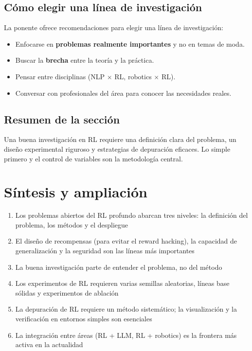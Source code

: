 \documentclass[a4paper]{article}
\begin{document}
\subsection{Cómo elegir una línea de investigación}

La ponente ofrece recomendaciones para elegir una línea de investigación:
\begin{itemize}
    \item Enfocarse en \textbf{problemas realmente importantes} y no en temas de moda.
    \item Buscar la \textbf{brecha} entre la teoría y la práctica.
    \item Pensar entre disciplinas (NLP $\times$ RL, robotics $\times$ RL).
    \item Conversar con profesionales del área para conocer las necesidades reales.
\end{itemize}

\subsection{Resumen de la sección}

Una buena investigación en RL requiere una definición clara del problema, un diseño experimental riguroso y estrategias de depuración eficaces. Lo simple primero y el control de variables son la metodología central.
\section{Síntesis y ampliación}

\begin{enumerate}
    \item Los problemas abiertos del RL profundo abarcan tres niveles: la definición del problema, los métodos y el despliegue
    \item El diseño de recompensas (para evitar el reward hacking), la capacidad de generalización y la seguridad son las líneas más importantes
    \item La buena investigación parte de entender el problema, no del método
    \item Los experimentos de RL requieren varias semillas aleatorias, líneas base sólidas y experimentos de ablación
    \item La depuración de RL requiere un método sistemático; la visualización y la verificación en entornos simples son esenciales
    \item La integración entre áreas (RL + LLM, RL + robotics) es la frontera más activa en la actualidad
\end{enumerate}
\end{document}
